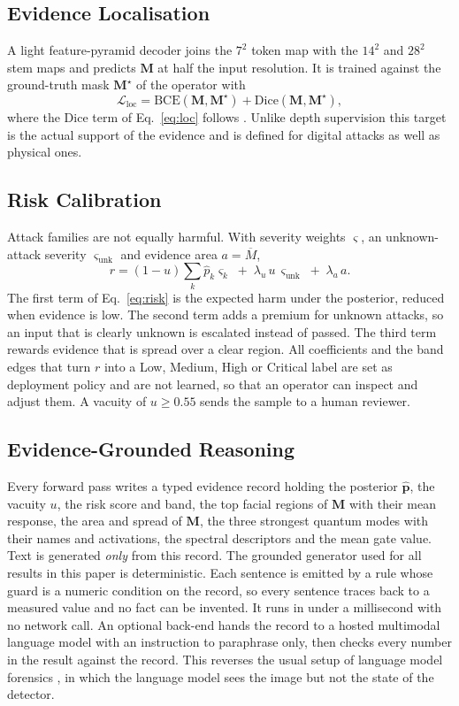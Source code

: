 \documentclass[conference]{IEEEtran}
\newcommand{\bs}[1]{\boldsymbol{#1}}
\newcommand{\sub}[1]{\subsection{\texorpdfstring{\textbf{#1}}{#1}}}
\begin{document}
\sub{Evidence Localisation}
A light feature-pyramid decoder joins the $7^{2}$ token map with the $14^{2}$ and
$28^{2}$ stem maps and predicts $\bs{M}$ at half the input resolution. It is trained
against the ground-truth mask $\bs{M}^{\star}$ of the operator with
\begin{equation}
\mathcal{L}_{\text{loc}} = \mathrm{BCE}(\bs{M},\bs{M}^{\star})
+ \mathrm{Dice}(\bs{M},\bs{M}^{\star}),
\label{eq:loc}
\end{equation}
where the Dice term of Eq.~\eqref{eq:loc} follows \cite{milletari2016vnet}. Unlike
depth supervision \cite{liu2018auxiliary,yu2021revisiting} this target is the actual
support of the evidence and is defined for digital attacks as well as physical ones.

\sub{Risk Calibration}
Attack families are not equally harmful. With severity weights $\bs{\varsigma}$, an
unknown-attack severity $\varsigma_{\text{unk}}$ and evidence area $a=\overline{M}$,
\begin{equation}
r = (1-u)\sum_{k}\hat{p}_{k}\varsigma_{k} \;+\; \lambda_{u}\,u\,\varsigma_{\text{unk}}
\;+\; \lambda_{a}\,a .
\label{eq:risk}
\end{equation}
The first term of Eq.~\eqref{eq:risk} is the expected harm under the posterior,
reduced when evidence is low. The second term adds a premium for unknown attacks, so
an input that is clearly unknown is escalated instead of passed. The third term
rewards evidence that is spread over a clear region. All coefficients and the band
edges that turn $r$ into a Low, Medium, High or Critical label are set as deployment
policy and are not learned, so that an operator can inspect and adjust them. A
vacuity of $u\ge0.55$ sends the sample to a human reviewer.

\sub{Evidence-Grounded Reasoning}
Every forward pass writes a typed evidence record holding the posterior
$\hat{\bs{p}}$, the vacuity $u$, the risk score and band, the top facial regions of
$\bs{M}$ with their mean response, the area and spread of $\bs{M}$, the three
strongest quantum modes with their names and activations, the spectral descriptors
and the mean gate value. Text is generated \emph{only} from this record. The grounded
generator used for all results in this paper is deterministic. Each sentence is
emitted by a rule whose guard is a numeric condition on the record, so every sentence
traces back to a measured value and no fact can be invented. It runs in under a
millisecond with no network call. An optional back-end hands the record to a hosted
multimodal language model with an instruction to paraphrase only, then checks every
number in the result against the record. This reverses the usual setup of language
model forensics \cite{huang2024ffaa,guo2025m2f2det}, in which the language model sees
the image but not the state of the detector.
\end{document}
